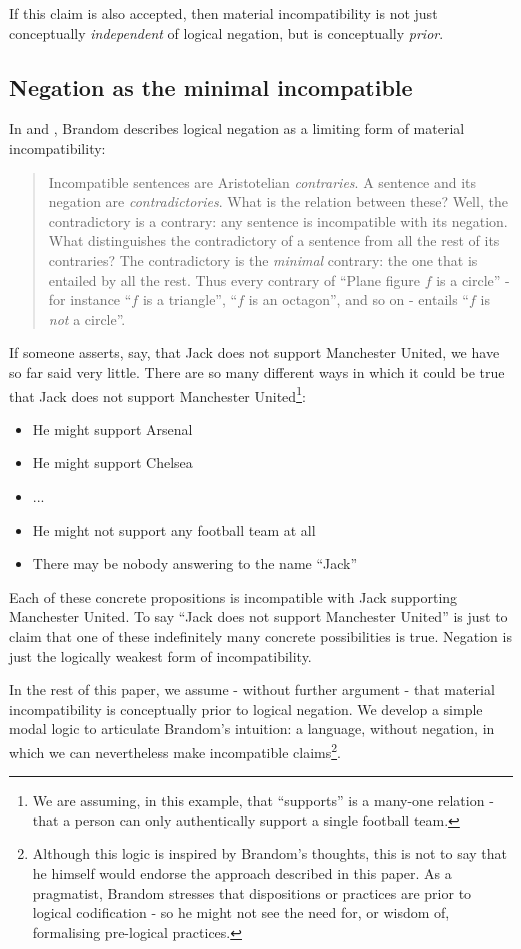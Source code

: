 \NI If this claim is also accepted, then material incompatibility is
not just conceptually \emph{independent} of logical negation, but is
conceptually \emph{prior}.  

\subsection{Negation as the minimal incompatible}

In \cite{brandom2} and \cite{brandom}, Brandom describes 
logical negation as a limiting form of material incompatibility:
\begin{quote}
Incompatible sentences are Aristotelian \emph{contraries}. A sentence
and its negation are \emph{contradictories}. What is the relation
between these? Well, the contradictory is a contrary: any sentence is
incompatible with its negation. What distinguishes the contradictory
of a sentence from all the rest of its contraries? The contradictory
is the \emph{minimal} contrary: the one that is entailed by all the
rest. Thus every contrary of ``Plane figure $f$ is a circle'' - for
instance ``$f$ is a triangle'', ``$f$ is an octagon'', and so on -
entails ``$f$ is \emph{not} a circle''.
\end{quote}

\NI If someone asserts, say, that Jack does not support Manchester United, we have so far said very little.  
There are so many different ways in which it could be true that Jack does not support Manchester United\footnote{We are assuming, in this example, that ``supports'' is a many-one relation - that a person can only authentically support a single football team.}:
\begin{itemize}
\item
He might support Arsenal
\item
He might support Chelsea
\item
...
\item
He might not support any football team at all
\item
There may be nobody answering to the name ``Jack''
\end{itemize}
Each of these concrete propositions is incompatible with Jack supporting Manchester United.
To say ``Jack does not support Manchester United'' is just to claim that one of these indefinitely many concrete possibilities is true.
Negation is just the logically weakest form of incompatibility.

In the rest of this paper, we assume - without further argument - that material incompatibility is conceptually prior to logical negation.
We develop a simple
 modal logic to articulate Brandom's intuition: a language, without negation, in which we can nevertheless make incompatible claims\footnote{Although this logic is inspired by Brandom's thoughts, this is not to say that he himself would endorse the approach described in this paper. As a pragmatist, Brandom stresses that dispositions or practices are prior to logical codification - so he might not see the need for, or wisdom of, formalising pre-logical practices.}.

